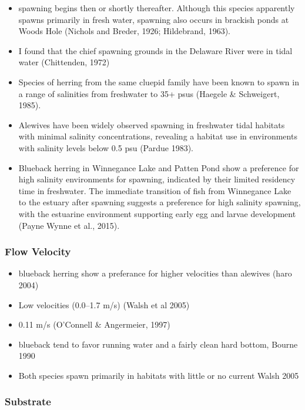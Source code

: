 \documentclass[
]{book}
\providecommand{\tightlist}{%
  \setlength{\itemsep}{0pt}\setlength{\parskip}{0pt}}
\begin{document}
\begin{itemize}
\item
  spawning begins then or shortly thereafter. Although this species apparently spawns primarily in fresh water, spawning also occurs in brackish ponds at Woods Hole (Nichols and Breder, 1926; Hildebrand, 1963).
\item
  I found that the chief spawning grounds in the Delaware River were in tidal water (Chittenden, 1972)
\item
  Species of herring from the same cluepid family have been known to spawn in a range of salinities from freshwater to 35+ psus (Haegele \& Schweigert, 1985).
\item
  Alewives have been widely observed spawning in freshwater tidal habitats with minimal salinity concentrations, revealing a habitat use in environments with salinity levels below 0.5 psu (Pardue 1983).
\item
  Blueback herring in Winnegance Lake and Patten Pond show a preference for high salinity environments for spawning, indicated by their limited residency time in freshwater. The immediate transition of fish from Winnegance Lake to the estuary after spawning suggests a preference for high salinity spawning, with the estuarine environment supporting early egg and larvae development (Payne Wynne et al., 2015).
\end{itemize}

\hypertarget{flow-velocity-3}{%
\subsubsection{Flow Velocity}\label{flow-velocity-3}}

\begin{itemize}
\tightlist
\item
  blueback herring show a preferance for higher velocities than alewives (haro 2004)
\item
  Low velocities (0.0--1.7 m/s) (Walsh et al 2005)
\item
  0.11 m/s (O'Connell \& Angermeier, 1997)
\item
  blueback tend to favor running water and a fairly clean hard bottom, Bourne 1990
\item
  Both species spawn primarily in habitats with little or no current Walsh 2005
\end{itemize}

\hypertarget{substrate-3}{%
\subsubsection{Substrate}\label{substrate-3}}
\end{document}
